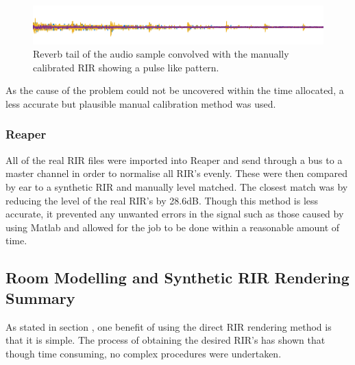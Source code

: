 \documentclass[../../main.tex]{subfiles}
\begin{document}
			\begin{figure}[H]
				\begin{center}
					\includegraphics[scale = 1]{Sections/Implementation/RealRIRs/images/calibration/cal_pulse.png} 
					\caption{Reverb tail of the audio sample convolved with the manually calibrated \ac{RIR} showing a pulse like pattern.}
					\label{pulse}
				\end{center}
			\end{figure}

			As the cause of the problem could not be uncovered within the time allocated, a less accurate but plausible manual calibration method was used.

		\subsubsection{Reaper}

			All of the real \ac{RIR} files were imported into Reaper and send through a bus to a master channel in order to normalise all \ac{RIR}'s evenly. These were then compared by ear to a synthetic \ac{RIR} and manually level matched. The closest match was by reducing the level of the real \ac{RIR}'s by 28.6dB. Though this method is less accurate, it prevented any unwanted errors in the signal such as those caused by using Matlab and allowed for the job to be done within a reasonable amount of time.

		\subsection{Room Modelling and Synthetic RIR Rendering Summary}


			As stated in section , one benefit of using the direct \ac{RIR} rendering method is that it is simple. The process of obtaining the desired \ac{RIR}'s has shown that though time consuming, no complex procedures were undertaken.

\end{document}
